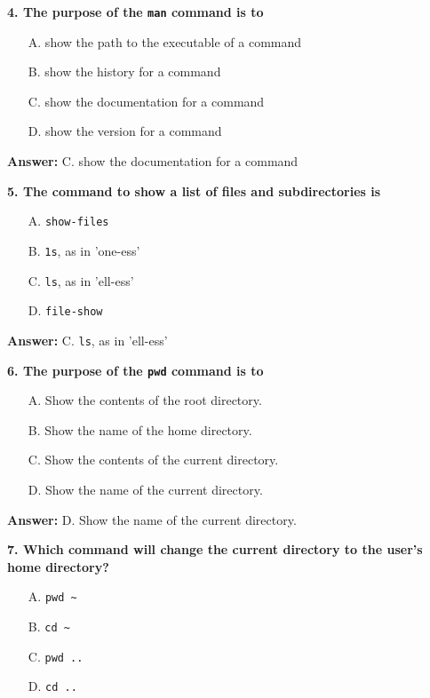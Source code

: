 \documentclass{article}
\begin{document}
\textbf{4. The purpose of the \texttt{man} command is to}

\begin{itemize}
  \item[A.] show the path to the executable of a command
  \item[B.] show the history for a command
  \item[C.] show the documentation for a command
  \item[D.] show the version for a command
\end{itemize}

\textbf{Answer:} C. show the documentation for a command

\vspace{0.5cm}

\textbf{5. The command to show a list of files and subdirectories is}

\begin{itemize}
  \item[A.] \texttt{show-files}
  \item[B.] \texttt{1s}, as in 'one-ess'
  \item[C.] \texttt{ls}, as in 'ell-ess'
  \item[D.] \texttt{file-show}
\end{itemize}

\textbf{Answer:} C. \texttt{ls}, as in 'ell-ess'

\vspace{0.5cm}

\textbf{6. The purpose of the \texttt{pwd} command is to}

\begin{itemize}
  \item[A.] Show the contents of the root directory.
  \item[B.] Show the name of the home directory.
  \item[C.] Show the contents of the current directory.
  \item[D.] Show the name of the current directory.
\end{itemize}

\textbf{Answer:} D. Show the name of the current directory.

\vspace{0.5cm}

\textbf{7. Which command will change the current directory to the user's home directory?}

\begin{itemize}
  \item[A.] \texttt{pwd \~}
  \item[B.] \texttt{cd \~}
  \item[C.] \texttt{pwd ..}
  \item[D.] \texttt{cd ..}
\end{itemize}
\end{document}
